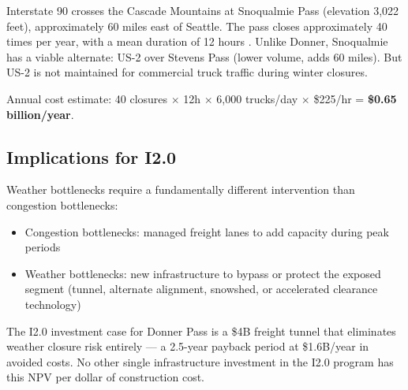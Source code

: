 Interstate 90 crosses the Cascade Mountains at Snoqualmie Pass (elevation 3,022 feet), approximately 60 miles east of Seattle. The pass closes approximately 40 times per year, with a mean duration of 12 hours \citep{WSDOT2023}. Unlike Donner, Snoqualmie has a viable alternate: US-2 over Stevens Pass (lower volume, adds 60 miles). But US-2 is not maintained for commercial truck traffic during winter closures.

Annual cost estimate: 40 closures $\times$ 12h $\times$ 6,000 trucks/day $\times$ \$225/hr = \textbf{\$0.65 billion/year}.

\subsection{Implications for I2.0}

Weather bottlenecks require a fundamentally different intervention than congestion bottlenecks:
\begin{itemize}
\item Congestion bottlenecks: managed freight lanes to add capacity during peak periods
\item Weather bottlenecks: new infrastructure to bypass or protect the exposed segment (tunnel, alternate alignment, snowshed, or accelerated clearance technology)
\end{itemize}

The I2.0 investment case for Donner Pass is a \$4B freight tunnel that eliminates weather closure risk entirely --- a 2.5-year payback period at \$1.6B/year in avoided costs. No other single infrastructure investment in the I2.0 program has this NPV per dollar of construction cost.
